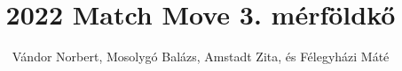 \documentclass[sigplan,11pt,nonacm=true]{acmart}
\begin{document}
\title{2022 Match Move 3. mérföldkő}


\author{Vándor Norbert, Mosolygó Balázs, Amstadt Zita, és Félegyházi Máté}


\maketitle






\end{document}
